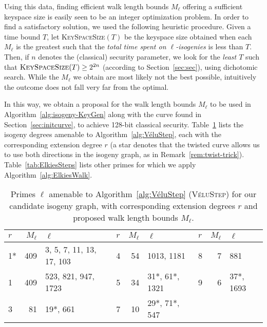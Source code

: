 \documentclass{llncs}
\newcommand{\algstyle}[1]{\textsc{#1}}
\begin{document}
Using this data, finding efficient walk length bounds $M_\ell$
offering a sufficient keyspace size is easily seen to be an
integer optimization problem. In order to find a
satisfactory solution, we used the following heuristic procedure.
Given a time bound $T$, let \algstyle{KeySpaceSize}$(T)$ be
the keyspace size obtained when each $M_\ell$ is the greatest such
that the \emph{total time spent on $\ell$-isogenies} is less than $T$.
Then, if $n$ denotes the (classical) security parameter,
we look for the \emph{least $T$} such that
$
	\algstyle{KeySpaceSize}(T)\geq 2^{2n}
$
(according to Section~\ref{sec:sec}), using dichotomic search.
While the $M_\ell$
we obtain are most likely not the best possible, intuitively
the outcome does not fall very far from the optimal.

In this way, we obtain a proposal for the walk length bounds $M_\ell$
to be used in Algorithm~\ref{alg:isogeny-KeyGen} along with the curve
found in Section~\ref{sec:initcurve}, to achieve 128-bit
classical security. Table~\ref{tab:VéluSteps}
lists the isogeny degrees amenable to Algorithm~\ref{alg:VéluStep},
each with the corresponding extension degree $r$ 
(a star denotes that the twisted curve
allows us to use both directions in the isogeny graph,
as in Remark~\ref{rem:twist-trick}).
Table~\ref{tab:ElkiesSteps}
lists other primes for which we apply Algorithm~\ref{alg:ElkiesWalk}.

\begin{table}
    \centering
    \begin{tabular}{l|@{\;}r@{\;}|@{\;}l@{\;}||l|@{\;}r@{\;}|@{\;}l@{\;}||@{\;}l|r@{\;}|@{\;}l}
        $r$ & $M_\ell$ & $\ell$
        &
        $r$ & $M_\ell$ & $\ell$
        &
        $r$ & $M_\ell$ & $\ell$
        \\
        \hline
        1* & 409 & 3, 5, 7, 11, 13, 17, 103
        &
        4 & 54 & 1013, 1181
        &
        8 & 7 & 881
        \\
        1 & 409 & 523, 821, 947, 1723
        &
        5 & 34 & 31*, 61*, 1321
        &
        9 & 6 & 37*, 1693
        \\
        3 & 81 & 19*, 661
        &
        7 & 10 & 29*, 71*, 547
        & & 
        \\
        \hline
    \end{tabular}
    \smallskip
    \caption{Primes $\ell$ amenable to Algorithm~\ref{alg:VéluStep}
		(\algstyle{VéluStep}) for our candidate isogeny graph,
    with corresponding extension degrees $r$ 
    and proposed walk length bounds $M_\ell$.}
    \label{tab:VéluSteps}
\end{table}
\end{document}
